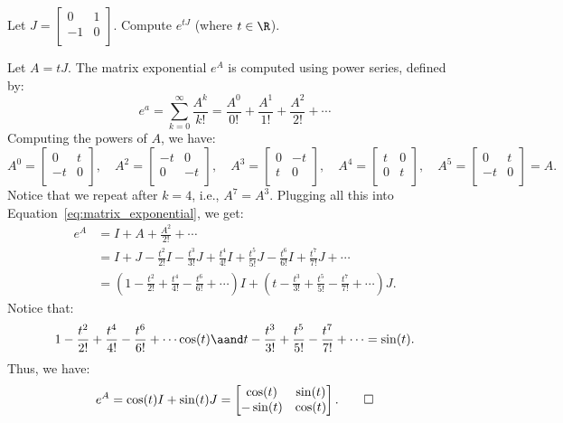 \begin{problem}[1]
  Let $J = \begin{bmatrix}
    0 & 1 \\
    -1 & 0 \\
  \end{bmatrix}$. Compute $e^{tJ}$ (where $t \in \R$).
\end{problem}

\begin{solution}
  Let $A = tJ$. The matrix exponential $e^A$ is computed using power series, defined by:
  \begin{equation}\label{eq:matrix_exponential}
    e^a = \sum_{k=0}^\infty \frac{A^k}{k!} = \frac{A^0}{0!} + \frac{A^1}{1!} + \frac{A^2}{2!} + \cdots
  \end{equation}
  Computing the powers of $A$, we have:
  \[%
    A^0 = \begin{bmatrix}
      0 & t \\
      -t & 0 \\
    \end{bmatrix}, \quad
    A^2 = \begin{bmatrix}
      -t & 0 \\
      0 & -t \\
    \end{bmatrix}, \quad
    A^3 = \begin{bmatrix}
      0 & -t \\
      t & 0 \\
    \end{bmatrix}, \quad
    A^4 = \begin{bmatrix}
      t & 0 \\
      0 & t \\
    \end{bmatrix}, \quad
    A^5 = \begin{bmatrix}
      0 & t \\
      -t & 0 \\
    \end{bmatrix} = A
  .\]%
  Notice that we repeat after $k = 4$, i.e., $A^7 = A^3$. Plugging all this into Equation~\eqref{eq:matrix_exponential}, we get:
  \begin{align*}
    e^A &= I + A + \frac{A^2}{2!} + \cdots \\
        &= I + J - \frac{t^2}{2!}I - \frac{t^3}{3!}J + \frac{t^4}{4!}I + \frac{t^5}{5!}J - \frac{t^6}{6!}I + \frac{t^7}{7!}J + \cdots \\
        &= \left(1 - \frac{t^2}{2!} + \frac{t^4}{4!} - \frac{t^6}{6!} + \cdots\right)I + \left(t - \frac{t^3}{3!} + \frac{t^5}{5!} - \frac{t^7}{7!} + \cdots\right)J
  .\end{align*}
  Notice that:
  \[%
    1 - \frac{t^2}{2!} + \frac{t^4}{4!} - \frac{t^6}{6!} + \cdots \cos(t) \aand t - \frac{t^3}{3!} + \frac{t^5}{5!} - \frac{t^7}{7!} + \cdots = \sin(t)
  .\]%
  Thus, we have:
  \[%
    e^A = \cos(t)I + \sin(t)J = \begin{bmatrix}
      \cos(t) & \sin(t) \\
      -\sin(t) & \cos(t) \\
    \end{bmatrix}
  .\qedhere\]%
\end{solution}

